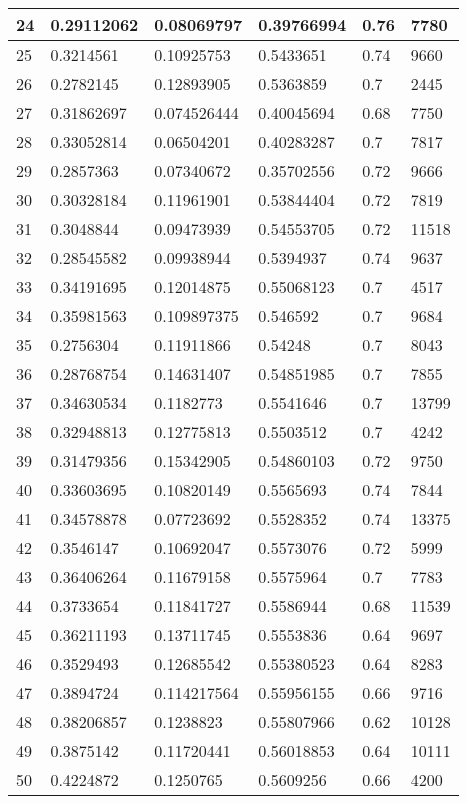 \begin{longtable}{|l|l|l|l|l|l|}
24 & 0.29112062 & 0.08069797 & 0.39766994 & 0.76 & 7780 \\ \hline 
25 & 0.3214561 & 0.10925753 & 0.5433651 & 0.74 & 9660 \\ \hline 
26 & 0.2782145 & 0.12893905 & 0.5363859 & 0.7 & 2445 \\ \hline 
27 & 0.31862697 & 0.074526444 & 0.40045694 & 0.68 & 7750 \\ \hline 
28 & 0.33052814 & 0.06504201 & 0.40283287 & 0.7 & 7817 \\ \hline 
29 & 0.2857363 & 0.07340672 & 0.35702556 & 0.72 & 9666 \\ \hline 
30 & 0.30328184 & 0.11961901 & 0.53844404 & 0.72 & 7819 \\ \hline 
31 & 0.3048844 & 0.09473939 & 0.54553705 & 0.72 & 11518 \\ \hline 
32 & 0.28545582 & 0.09938944 & 0.5394937 & 0.74 & 9637 \\ \hline 
33 & 0.34191695 & 0.12014875 & 0.55068123 & 0.7 & 4517 \\ \hline 
34 & 0.35981563 & 0.109897375 & 0.546592 & 0.7 & 9684 \\ \hline 
35 & 0.2756304 & 0.11911866 & 0.54248 & 0.7 & 8043 \\ \hline 
36 & 0.28768754 & 0.14631407 & 0.54851985 & 0.7 & 7855 \\ \hline 
37 & 0.34630534 & 0.1182773 & 0.5541646 & 0.7 & 13799 \\ \hline 
38 & 0.32948813 & 0.12775813 & 0.5503512 & 0.7 & 4242 \\ \hline 
39 & 0.31479356 & 0.15342905 & 0.54860103 & 0.72 & 9750 \\ \hline 
40 & 0.33603695 & 0.10820149 & 0.5565693 & 0.74 & 7844 \\ \hline 
41 & 0.34578878 & 0.07723692 & 0.5528352 & 0.74 & 13375 \\ \hline 
42 & 0.3546147 & 0.10692047 & 0.5573076 & 0.72 & 5999 \\ \hline 
43 & 0.36406264 & 0.11679158 & 0.5575964 & 0.7 & 7783 \\ \hline 
44 & 0.3733654 & 0.11841727 & 0.5586944 & 0.68 & 11539 \\ \hline 
45 & 0.36211193 & 0.13711745 & 0.5553836 & 0.64 & 9697 \\ \hline 
46 & 0.3529493 & 0.12685542 & 0.55380523 & 0.64 & 8283 \\ \hline 
47 & 0.3894724 & 0.114217564 & 0.55956155 & 0.66 & 9716 \\ \hline 
48 & 0.38206857 & 0.1238823 & 0.55807966 & 0.62 & 10128 \\ \hline 
49 & 0.3875142 & 0.11720441 & 0.56018853 & 0.64 & 10111 \\ \hline 
50 & 0.4224872 & 0.1250765 & 0.5609256 & 0.66 & 4200 \\ \hline 
\end{longtable}
